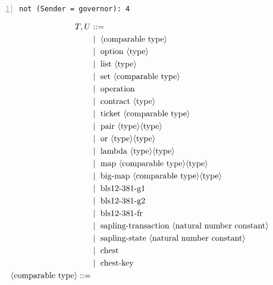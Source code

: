 \begin{lstlisting}[float=tp,captionpos=b,caption={Failwith condition for the entrypoint setMaxDataDelaySec},label={lst:setMaxDataDelaySec},numbers=left]
not (Sender = governor): 4
\end{lstlisting}
\newpage
\begin{figure} []
\begin{align*}
T, U &::= \\
   &\Mid\ \langle \text{comparable type}\rangle \\
   &\Mid\ \text{option}\ \langle\text{type}\rangle \\
   &\Mid\ \text{list}\ \langle\text{type}\rangle \\
   &\Mid\ \text{set}\ \langle\text{comparable type}\rangle \\
   &\Mid\ \text{operation} \\
   &\Mid\ \text{contract}\ \langle\text{type}\rangle \\
   &\Mid\ \text{ticket}\ \langle\text{comparable type}\rangle \\
   &\Mid\ \text{pair}\ \langle\text{type}\rangle \langle\text{type}\rangle \\
   &\Mid\ \text{or}\ \langle\text{type}\rangle \langle\text{type}\rangle \\
   &\Mid\ \text{lambda}\ \langle\text{type}\rangle \langle\text{type}\rangle \\
   &\Mid\ \text{map}\ \langle\text{comparable type}\rangle \langle\text{type}\rangle \\
   &\Mid\ \text{big-map}\ \langle\text{comparable type}\rangle \langle\text{type}\rangle \\
   &\Mid\ \text{bls12-381-g1} \\
   &\Mid\ \text{bls12-381-g2} \\
   &\Mid\ \text{bls12-381-fr} \\
   &\Mid\ \text{sapling-transaction}\ \langle\text{natural number constant}\rangle \\
   &\Mid\ \text{sapling-state}\ \langle\text{natural number constant}\rangle \\
   &\Mid\ \text{chest} \\
   &\Mid\ \text{chest-key} \\
\langle\text{comparable type}\rangle ::= \\

\end{align*}
\end{figure}

